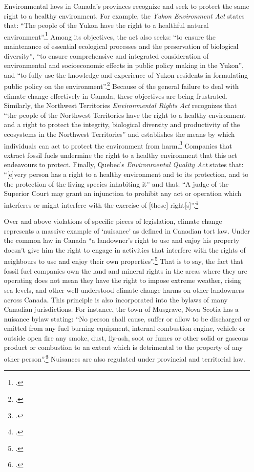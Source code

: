 \documentclass[10pt]{article}
\begin{document}
Environmental laws in Canada's provinces recognize and seek to protect the same right to a healthy environment.  
For example, the \emph{Yukon Environment Act} states that: ``The people of the Yukon have the right to a healthful natural environment''.\footcite[][p. 14]{YukonEnvAct}
Among its objectives, the act also seeks: ``to ensure the maintenance of essential ecological processes and the preservation of biological diversity'', ``to ensure comprehensive and integrated consideration of environmental and socioeconomic effects in public policy making in the Yukon'', and ``to fully use the knowledge and experience of Yukon residents in formulating public policy on the environment''.\footcite[][p. 13]{YukonEnvAct}
Because of the general failure to deal with climate change effectively in Canada, these objectives are being frustrated.
Similarly, the Northwest Territories \emph{Environmental Rights Act} recognizes that ``the people of the Northwest Territories have the right to a healthy environment and a right to protect the integrity, biological diversity and productivity of the ecosystems in the Northwest Territories'' and establishes the means by which individuals can act to protect the environment from harm.\footcite[][]{NWTEnvRightsAct}
Companies that extract fossil fuels undermine the right to a healthy environment that this act endeavours to protect. 
Finally, Quebec's \emph{Environmental Quality Act} states that: ``[e]very person has a right to a healthy environment and to its protection, and to the protection of the living species inhabiting it'' and that: ``A judge of the Superior Court may grant an injunction to prohibit any act or operation which interferes or might interfere with the exercise of [these] right[s]''.\footcite[][]{QuebecEQA}



Over and above violations of specific pieces of legislation, climate change represents a massive example of `nuisance' as defined in Canadian tort law.
Under the common law in Canada ``a landowner's right to use and enjoy his property doesn't give him the right to engage in activities that interfere with the rights of neighbours to use and enjoy their own properties''.\footcite[][]{NuisancesInsider}
That is to say, the fact that fossil fuel companies own the land and mineral rights in the areas where they are operating does not mean they have the right to impose extreme weather, rising sea levels, and other well-understood climate change harms on other landowners across Canada.
This principle is also incorporated into the bylaws of many Canadian jurisdictions.
For instance, the town of Musgrave, Nova Scotia has a nuisance bylaw stating: ``No person shall cause, suffer or allow to be discharged or emitted from any fuel burning equipment, internal combustion engine, vehicle or outside open fire any smoke, dust, fly-ash, soot or fumes or other solid or gaseous product or combustion to an extent which is detrimental to the property of any other person''.\footcite[][]{NuisancesInsider}
Nuisances are also regulated under provincial and territorial law.
\end{document}
